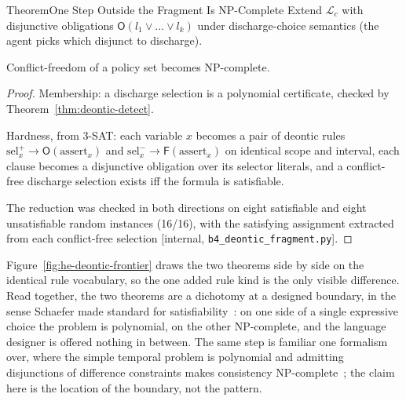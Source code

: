 \documentclass[11pt,a4paper]{article}
\theoremstyle{definition}
\theoremstyle{definition}
\theoremstyle{remark}
\begin{document}
\begin{pdclaim}{Theorem}{One Step Outside the Fragment Is NP-Complete}
\setlength{\parskip}{4pt plus 1pt}
\label{thm:deontic-frontier}
Extend $\mathcal{L}_c$ with disjunctive obligations
$\mathsf{O}(l_1\vee\dots\vee l_k)$ under discharge-choice semantics (the agent
picks which disjunct to discharge). 

Conflict-freedom of a policy set becomes
NP-complete.
\end{pdclaim}
\begin{proof}
\setlength{\parskip}{4pt plus 1pt}
Membership: a discharge selection is a polynomial certificate, checked by
Theorem~\ref{thm:deontic-detect}. 

Hardness, from 3-SAT: each variable $x$
becomes a pair of deontic rules $\mathrm{sel}^{+}_x\to\mathsf{O}(\mathrm{assert}_x)$
and $\mathrm{sel}^{-}_x\to\mathsf{F}(\mathrm{assert}_x)$ on identical scope and
interval, each clause becomes a disjunctive obligation over its selector
literals, and a conflict-free discharge selection exists iff the formula is
satisfiable. 

The reduction was checked in both directions on eight satisfiable
and eight unsatisfiable random instances (16/16), with the satisfying
assignment extracted from each conflict-free selection [internal,
\texttt{b4\_deontic\_fragment.py}].
\end{proof}



Figure~\ref{fig:he-deontic-frontier} draws the two theorems side by side on
the identical rule vocabulary, so the one added rule kind is the only visible
difference. Read together, the two theorems are a dichotomy at a designed boundary, in the
sense Schaefer made standard for satisfiability~: on one side
of a single expressive choice the problem is polynomial, on the other
NP-complete, and the language designer is offered nothing in between. The same
step is familiar one formalism over, where the simple temporal problem is
polynomial and admitting disjunctions of difference constraints makes
consistency NP-complete~; the claim here is the location of the
boundary, not the pattern.
\end{document}
